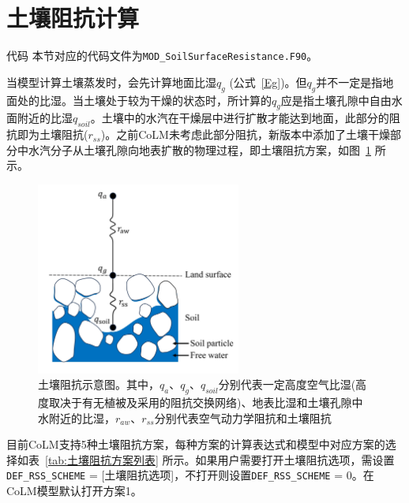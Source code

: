 \section{土壤阻抗计算}
\begin{mymdframed}{代码}
本节对应的代码文件为\texttt{MOD\_SoilSurfaceResistance.F90}。
\end{mymdframed}

当模型计算土壤蒸发时，会先计算地面比湿\(q_{g}\) (公式~\eqref{Eg})。但\(q_{g}\)并不一定是指地面处的比湿。当土壤处于较为干燥的状态时，所计算的\(q_{g}\)应是指土壤孔隙中自由水面附近的比湿\(q_{soil}\)。土壤中的水汽在干燥层中进行扩散才能达到地面，此部分的阻抗即为土壤阻抗(\(r_{ss}\))。之前CoLM未考虑此部分阻抗，新版本中添加了土壤干燥部分中水汽分子从土壤孔隙向地表扩散的物理过程，即土壤阻抗方案，如图~\ref{fig:土壤阻抗示意图} 所示。

{
\begin{figure}[htbp]
\centering
\includegraphics[width=0.6\textwidth]{Figures/地表湍流交换过程/土壤阻抗示意图_v2.jpg}
\caption{土壤阻抗示意图。其中，\(q_{a}\)、\(q_{g}\)、\(q_{soil}\)分别代表一定高度空气比湿(高度取决于有无植被及采用的阻抗交换网络)、地表比湿和土壤孔隙中水附近的比湿，\(r_{aw}\)、\(r_{ss}\)分别代表空气动力学阻抗和土壤阻抗}
\label{fig:土壤阻抗示意图}
\end{figure}
}

目前CoLM支持5种土壤阻抗方案，每种方案的计算表达式和模型中对应方案的选择如表~\ref{tab:土壤阻抗方案列表} 所示。如果用户需要打开土壤阻抗选项，需设置\texttt{DEF\_RSS\_SCHEME}
= {[}土壤阻抗选项{]}，不打开则设置\texttt{DEF\_RSS\_SCHEME} =
0。在CoLM模型默认打开方案1。

